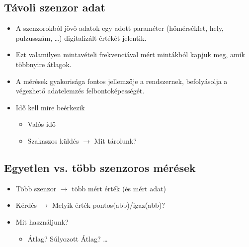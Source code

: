 \subsection{Távoli szenzor adat}
\begin{itemize}
    \item A szenzorokból jövő adatok egy adott paraméter (hőmérséklet, hely, pulzusszám, \dots) digitalizált értékét jelentik.
    \item Ezt valamilyen mintavételi frekvenciával mért mintákból kapjuk meg, amik többnyire átlagok.
    \item A mérések gyakorisága fontos jellemzője a rendszernek, befolyásolja a végezhető adatelemzés felbontoképességét.
    \item Idő kell mire beérkezik
    \begin{itemize}
        \item Valós idő
        \item Szakaszos küldés $\rightarrow$ Mit tárolunk?
    \end{itemize}
\end{itemize}

\subsection{Egyetlen vs. több szenzoros mérések}
\begin{itemize}
    \item Több szenzor $\rightarrow$ több mért érték (és mért adat)
    \item Kérdés $\rightarrow$ Melyik érték pontos(abb)/igaz(abb)?
    \item Mit használjunk?
    \begin{itemize}
        \item Átlag? Súlyozott Átlag? \dots
    \end{itemize}
\end{itemize}

